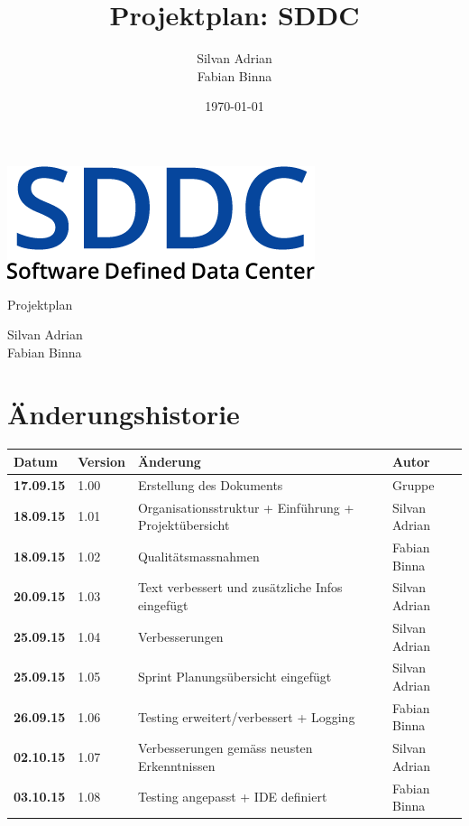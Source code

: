 \documentclass[11pt]{scrartcl}
\title{Projektplan: SDDC}
\author{Silvan Adrian \\ Fabian Binna}
\date{\today{}}
\begin{document}
\def\arraystretch{1.5}
\begin{titlepage}
\begin{center}
\vspace{10em}
\includegraphics[scale=2]{SDDC}
\vspace{10em}
\end{center}
\begin{center}
\huge {Projektplan}
\end{center}
\begin{center}
\vspace{10em}
\LARGE {Silvan Adrian} \\
\LARGE {Fabian Binna}
\end{center}

\end{titlepage}

\newpage
\section{Änderungshistorie}
\begin{tabularx}{\textwidth}{l l X l}
\textbf{Datum} & \textbf{Version} & \textbf{Änderung}  & \textbf{Autor} \\
\hline
\textbf{17.09.15} & 1.00 & Erstellung des Dokuments & Gruppe \\
\textbf{18.09.15} & 1.01 & Organisationsstruktur + Einführung + 
Projektübersicht & Silvan Adrian\\
\textbf{18.09.15} & 1.02 & Qualitätsmassnahmen & Fabian Binna\\
\textbf{20.09.15} & 1.03 &  Text verbessert und zusätzliche Infos eingefügt & Silvan Adrian\\
\textbf{25.09.15} & 1.04 & Verbesserungen & Silvan Adrian\\
\textbf{25.09.15} & 1.05 & Sprint Planungsübersicht eingefügt & Silvan Adrian\\
\textbf{26.09.15} & 1.06 & Testing erweitert/verbessert + Logging & Fabian 
Binna\\
\textbf{02.10.15} & 1.07 & Verbesserungen gemäss neusten Erkenntnissen & Silvan 
Adrian\\
\textbf{03.10.15} & 1.08 & Testing angepasst + IDE definiert & Fabian Binna\\
\end{tabularx}
\end{document}

